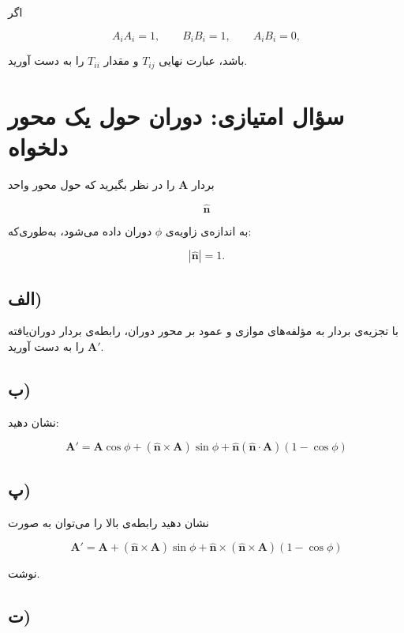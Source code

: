 \documentclass[a4paper,16pt]{article}
\begin{document}
	اگر
	
	\[
	A_iA_i=1,
	\qquad
	B_iB_i=1,
	\qquad
	A_iB_i=0,
	\]
	
	باشد، عبارت نهایی $T_{ij}$ و مقدار $T_{ii}$ را به دست آورید.
	
	
	
	\section{سؤال امتیازی: دوران حول یک محور دلخواه}
	
	بردار $\mathbf{A}$ را در نظر بگیرید که حول محور واحد
	
	\[
	\hat{\mathbf{n}}
	\]
	
	به اندازه‌ی زاویه‌ی $\phi$ دوران داده می‌شود، به‌طوری‌که:
	
	\[
	|\hat{\mathbf{n}}|=1.
	\]
	
	\subsection*{الف)}
	
	با تجزیه‌ی بردار به مؤلفه‌های موازی و عمود بر محور دوران، رابطه‌ی بردار دوران‌یافته $\mathbf{A}'$ را به دست آورید.
	
	\subsection*{ب)}
	
	نشان دهید:
	
	\[
	\boxed{
		\mathbf{A}'
		=
		\mathbf{A}\cos\phi
		+
		(\hat{\mathbf{n}}\times\mathbf{A})\sin\phi
		+
		\hat{\mathbf{n}}(\hat{\mathbf{n}}\cdot\mathbf{A})(1-\cos\phi)
	}
	\]
	
	\subsection*{پ)}
	
	نشان دهید رابطه‌ی بالا را می‌توان به صورت
	
	\[
	\boxed{
		\mathbf{A}'
		=
		\mathbf{A}
		+
		(\hat{\mathbf{n}}\times\mathbf{A})\sin\phi
		+
		\hat{\mathbf{n}}\times
		(\hat{\mathbf{n}}\times\mathbf{A})(1-\cos\phi)
	}
	\]
	
	نوشت.
	
	\subsection*{ت)}
	
\end{document}
